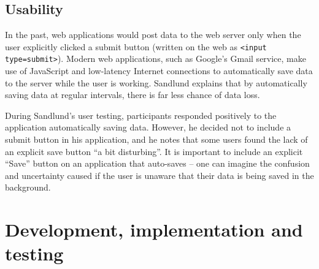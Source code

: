 \documentclass[twoside,draft]{scrartcl}
\let\stdsection\section
\renewcommand\section{\clearpage\stdsection}
\begin{document}












\subsection{Usability}


In the past, web applications would \gls{post} data to the web server only
when the user explicitly clicked a submit button (written on the web as
\texttt{<input type=submit>}). Modern web applications, such as Google's Gmail
service, make use of JavaScript and low-latency Internet connections to
automatically save data to the server while the user is working. Sandlund
\cite{sandlund2009websoftware} explains that by automatically saving data at
regular intervals, there is far less chance of data loss.

During Sandlund's user testing, participants responded positively to the
application automatically saving data. However, he decided not to include a
submit button in his application, and he notes that some users found the lack
of an explicit save button ``a bit disturbing''. It is important to include an
explicit ``Save'' button on an application that auto-saves -- one can imagine
the confusion and uncertainty caused if the user is unaware that their data is
being saved in the background.



% 

\section{Development, implementation and testing}
\label{sec:implementation}

\end{document}
